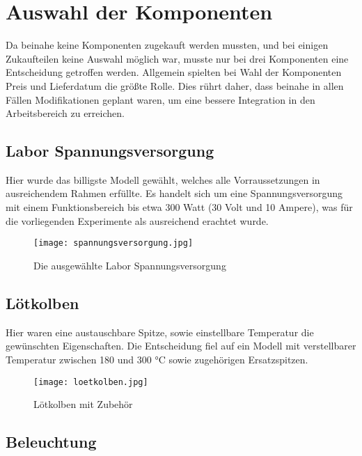 \section{Auswahl der Komponenten}

Da beinahe keine Komponenten zugekauft werden mussten, und bei einigen Zukaufteilen keine Auswahl möglich war, musste nur bei drei Komponenten eine Entscheidung getroffen werden.
Allgemein spielten bei Wahl der Komponenten Preis und Lieferdatum die größte Rolle.
Dies rührt daher, dass beinahe in allen Fällen Modifikationen geplant waren, um eine bessere Integration in den Arbeitsbereich zu erreichen.

\subsection{Labor Spannungsversorgung}

Hier wurde das billigste Modell gewählt, welches alle Vorraussetzungen in ausreichendem Rahmen erfüllte.
Es handelt sich um eine Spannungsversorgung mit einem Funktionsbereich bis etwa 300 Watt (30 Volt und 10 Ampere), was für die vorliegenden Experimente als ausreichend erachtet wurde.

\begin{figure}[H]
    \begin{center}
        \texttt{[image: spannungsversorgung.jpg]}
        \caption{Die ausgewählte Labor Spannungsversorgung}
    \end{center}
\end{figure}

\subsection{Lötkolben}

Hier waren eine austauschbare Spitze, sowie einstellbare Temperatur die gewünschten Eigenschaften.
Die Entscheidung fiel auf ein Modell mit verstellbarer Temperatur zwischen 180 und 300 °C sowie zugehörigen Ersatzspitzen.

\begin{figure}[H]
    \begin{center}
        \texttt{[image: loetkolben.jpg]}
        \caption{Lötkolben mit Zubehör}
    \end{center}
\end{figure}

\subsection{Beleuchtung}

